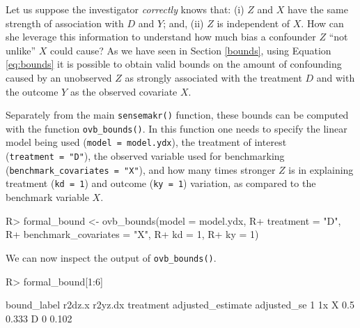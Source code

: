 \documentclass[
]{jss}
\begin{document}
Let us suppose the investigator \emph{correctly} knows that: (i) \(Z\)
and \(X\) have the same strength of association with \(D\) and \(Y\);
and, (ii) \(Z\) is independent of \(X\). How can she leverage this
information to understand how much bias a confounder \(Z\) ``not
unlike'' \(X\) could cause? As we have seen in Section \ref{bounds},
using Equation \ref{eq:bounds} it is possible to obtain valid bounds on
the amount of confounding caused by an unobserved \(Z\) as strongly
associated with the treatment \(D\) and with the outcome \(Y\) as the
observed covariate \(X\).

Separately from the main \texttt{sensemakr()} function, these bounds can
be computed with the function \texttt{ovb\_bounds()}. In this function
one needs to specify the linear model being used
(\texttt{model\ =\ model.ydx}), the treatment of interest
(\texttt{treatment\ =\ "D"}), the observed variable used for
benchmarking (\texttt{benchmark\_covariates\ =\ "X"}), and how many
times stronger \(Z\) is in explaining treatment (\texttt{kd\ =\ 1}) and
outcome (\texttt{ky\ =\ 1}) variation, as compared to the benchmark
variable \(X\).

\begin{CodeChunk}

\begin{CodeInput}
R> formal_bound <- ovb_bounds(model = model.ydx, 
R+                            treatment = "D", 
R+                            benchmark_covariates = "X", 
R+                            kd = 1, 
R+                            ky = 1)
\end{CodeInput}
\end{CodeChunk}

We can now inspect the output of \texttt{ovb\_bounds()}.

\begin{CodeChunk}

\begin{CodeInput}
R> formal_bound[1:6]
\end{CodeInput}
\end{CodeChunk}

\begin{CodeChunk}

\begin{CodeOutput}
  bound_label r2dz.x r2yz.dx treatment adjusted_estimate adjusted_se
1        1x X    0.5   0.333         D                 0       0.102
\end{CodeOutput}
\end{CodeChunk}
\end{document}
